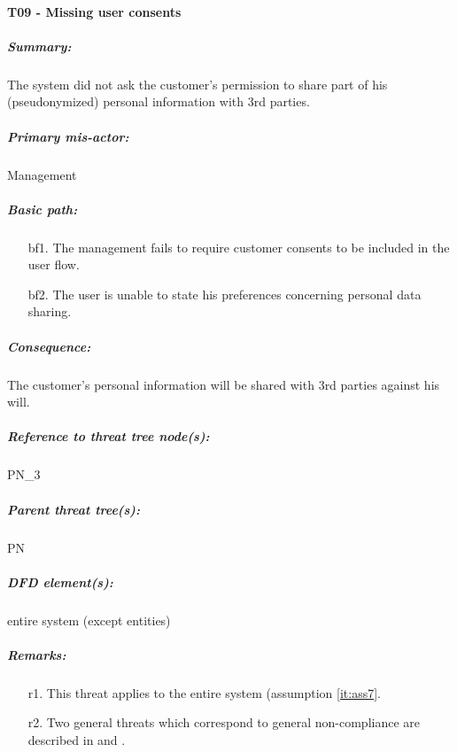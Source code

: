 

\paragraph{T09 - Missing user consents}
\label{par:t10}
    \subparagraph{Summary:} The system did not ask the customer's permission to share part of his (pseudonymized)
personal information with 3rd parties.
    \subparagraph{Primary mis-actor:} Management
    \subparagraph{Basic path:}
    \begin{enumerate}
        \item[bf1.] The management fails to require customer consents to be included in the user flow.
        \item[bf2.] The user is unable to state his preferences concerning personal data sharing.
    \end{enumerate}
    \subparagraph{Consequence:} The customer's personal information will be shared with 3rd parties against his will.


    \subparagraph{Reference to threat tree node(s):} PN\_3
    \subparagraph{Parent threat tree(s):} PN
    \subparagraph{DFD element(s):} entire system (except entities)
    \subparagraph{Remarks:}
    \begin{enumerate}
        \item[r1.] This threat applies to the entire system (assumption \ref{it:ass7}.
        \item[r2.] Two general threats which correspond to general non-compliance are described in  and .
    \end{enumerate}



